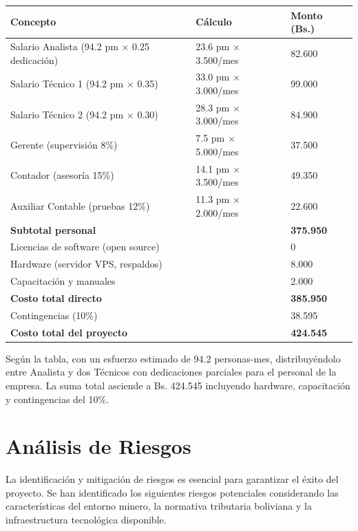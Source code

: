 \documentclass[stu]{apa7}
\begin{document}
\begin{longtable}{|C{4cm}|C{4cm}|C{4cm}|}
\hline
{}
\textbf{Concepto} & \textbf{Cálculo} & \textbf{Monto (Bs.)} \\
\hline
Salario Analista (94.2 pm $\times$ 0.25 dedicación) & 23.6 pm $\times$ 3.500/mes & 82.600 \\
\hline
Salario Técnico 1 (94.2 pm $\times$ 0.35) & 33.0 pm $\times$ 3.000/mes & 99.000 \\
\hline
Salario Técnico 2 (94.2 pm $\times$ 0.30) & 28.3 pm $\times$ 3.000/mes & 84.900 \\
\hline
Gerente (supervisión 8\%) & 7.5 pm $\times$ 5.000/mes & 37.500 \\
\hline
Contador (asesoría 15\%) & 14.1 pm $\times$ 3.500/mes & 49.350 \\
\hline
Auxiliar Contable (pruebas 12\%) & 11.3 pm $\times$ 2.000/mes & 22.600 \\
\hline
\textbf{Subtotal personal} & & \textbf{375.950} \\
\hline
Licencias de software (open source) & & 0 \\
\hline
Hardware (servidor VPS, respaldos) & & 8.000 \\
\hline
Capacitación y manuales & & 2.000 \\
\hline
\textbf{Costo total directo} & & \textbf{385.950} \\
\hline
Contingencias (10\%) & & 38.595 \\
\hline
{}
\textbf{Costo total del proyecto} & & \textbf{424.545} \\
\hline
\end{longtable}

Según la tabla, con un esfuerzo estimado de 94.2 personas-mes, distribuyéndolo entre Analista y dos Técnicos con dedicaciones parciales para el personal de la empresa. La suma total asciende a Bs. 424.545 incluyendo hardware, capacitación y contingencias del 10\%.

\section{Análisis de Riesgos}

La identificación y mitigación de riesgos es esencial para garantizar el éxito del proyecto. Se han identificado los siguientes riesgos potenciales considerando las características del entorno minero, la normativa tributaria boliviana y la infraestructura tecnológica disponible.
\end{document}
